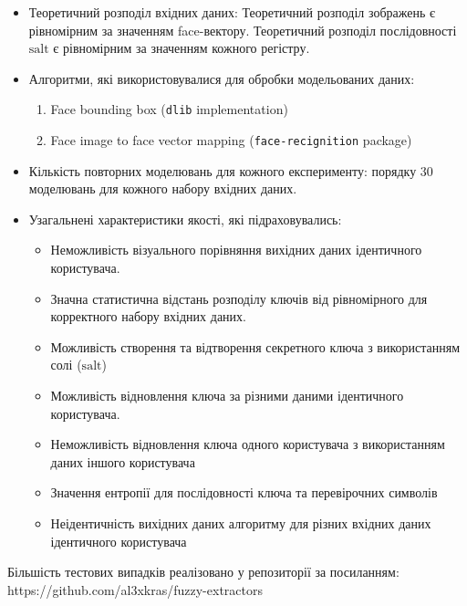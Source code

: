 \documentclass[11pt]{article}
\providecommand{\tightlist}{%
      \setlength{\itemsep}{0pt}\setlength{\parskip}{0pt}}
\begin{document}
\begin{itemize}
\tightlist
\item
  Теоретичний розподіл вхідних даних: Теоретичний розподіл зображень є
  рівномірним за значенням face-вектору. Теоретичний розподіл
  послідовності \(\text{salt}\) є рівномірним за значенням кожного
  регістру.
\item
  Алгоритми, які використовувалися для обробки модельованих даних:

  \begin{enumerate}
  \def\labelenumi{\arabic{enumi}.}
  \tightlist
  \item
    Face bounding box (\texttt{dlib} implementation)
  \item
    Face image to face vector mapping (\texttt{face-recignition}
    package)
  \end{enumerate}
\item
  Кількість повторних моделювань для кожного експерименту: порядку 30
  моделювань для кожного набору вхідних даних.
\item
  Узагальнені характеристики якості, які підраховувались:

  \begin{itemize}
  \tightlist
  \item
    Неможливість візуального порівняння вихідних даних ідентичного
    користувача.
  \item
    Значна статистична відстань розподілу ключів від рівномірного для
    корректного набору вхідних даних.
  \item
    Можливість створення та відтворення секретного ключа з використанням
    солі (\(\text{salt}\))
  \item
    Можливість відновлення ключа за різними даними ідентичного
    користувача.
  \item
    Неможливість відновлення ключа одного користувача з використанням
    даних іншого користувача
  \item
    Значення ентропії для послідовності ключа та перевірочних символів
  \item
    Неідентичність вихідних даних алгоритму для різних вхідних даних
    ідентичного користувача
  \end{itemize}
\end{itemize}

Більшість тестових випадків реалізовано у репозиторії за посиланням:
https://github.com/al3xkras/fuzzy-extractors
\end{document}
